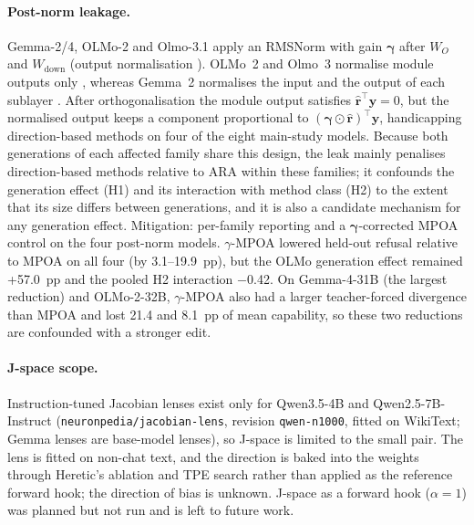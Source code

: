 \paragraph{Post-norm leakage.}
Gemma-2/4, OLMo-2 and Olmo-3.1 apply an RMSNorm \cite{zhang2019rmsnorm} with gain
$\boldsymbol{\gamma}$ after $W_O$ and $W_{\mathrm{down}}$ (output normalisation
\cite{kim2025periln}). OLMo~2 and Olmo~3 normalise module outputs only
\cite{walsh2025olmo2,olmo2025olmo3}, whereas Gemma~2 normalises the input and
the output of each sublayer \cite{gemmateam2024gemma2}. After orthogonalisation the module output
satisfies $\hat{\mathbf{r}}^{\top}\mathbf{y}=0$, but the normalised output keeps
a component proportional to
$(\boldsymbol{\gamma}\odot\hat{\mathbf{r}})^{\top}\mathbf{y}$, handicapping
direction-based methods on four of the eight main-study models. Because both
generations of each affected family share this design, the leak mainly
penalises direction-based methods relative to ARA within these families; it
confounds the generation effect (H1) and its interaction with method class (H2)
to the extent that its size differs between generations, and it is also a
candidate mechanism for any generation effect.
Mitigation: per-family reporting and a $\boldsymbol{\gamma}$-corrected MPOA
control on the four post-norm models. $\gamma$-MPOA lowered held-out refusal
relative to MPOA on all four (by 3.1--19.9~pp), but the OLMo generation effect
remained +57.0~pp and the pooled H2 interaction $-$0.42. On Gemma-4-31B
(the largest reduction) and OLMo-2-32B, $\gamma$-MPOA also had a larger
teacher-forced divergence than MPOA and lost 21.4 and 8.1~pp of mean
capability, so these two reductions are confounded with a stronger edit.

\paragraph{J-space scope.}
Instruction-tuned Jacobian lenses exist only for Qwen3.5-4B and
Qwen2.5-7B-Instruct (\texttt{neuronpedia/jacobian-lens}, revision
\texttt{qwen-n1000}, fitted on WikiText; Gemma lenses are base-model lenses), so
J-space is limited to the small pair. The lens is fitted on non-chat text, and the
direction is baked into the weights through Heretic's ablation and TPE search
rather than applied as the reference forward hook; the direction of bias is
unknown. J-space as a forward hook ($\alpha=1$) was planned but not run and is
left to future work.

